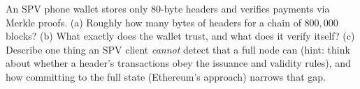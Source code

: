 \begin{exercise}
\label{ch36:ex-spv}
An SPV phone wallet stores only $80$-byte headers and verifies payments via Merkle proofs. (a) Roughly how many bytes of headers for a chain of $800{,}000$ blocks? (b) What exactly does the wallet trust, and what does it verify itself? (c) Describe one thing an SPV client \emph{cannot} detect that a full node can (hint: think about whether a header's transactions obey the issuance and validity rules), and how committing to the full state (Ethereum's approach) narrows that gap.
\end{exercise}
